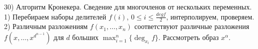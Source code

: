 30) Алгоритм Кронекера. Сведение для многочленов от нескольких переменных.\\
 1) Перебираем наборы делителей $f(i)$, $0 \le i \le \frac{deg f}{2}$, интерполируем, проверяем. 2) Различным разложениям $f(x_1,\dots,x_n)$ соответствуют различные разложения $f(x, \dots, x^{d^{n-1}})$ для $d$ больших $\max_{i=1}^n \{\deg_{x_i} f\}$. Рассмотреть образ $x^\alpha$.\\
